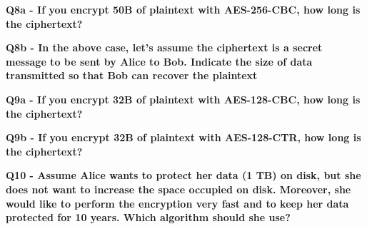 \textbf{Q8a - If you encrypt 50B of plaintext with AES-256-CBC, how long is the ciphertext?}

\textbf{Q8b - In the above case, let’s assume the ciphertext is a secret message to be sent by Alice to Bob. Indicate the size of data transmitted so that Bob can recover the plaintext}

\textbf{Q9a - If you encrypt 32B of plaintext with AES-128-CBC, how long is the ciphertext?}

\textbf{Q9b - If you encrypt 32B of plaintext with AES-128-CTR, how long is the ciphertext?}

\textbf{Q10 - Assume Alice wants to protect her data (1 TB) on disk, but she does not want to increase the space occupied on disk. Moreover, she would like to perform the encryption very fast and to keep her data protected for 10 years. Which algorithm should she use?}

